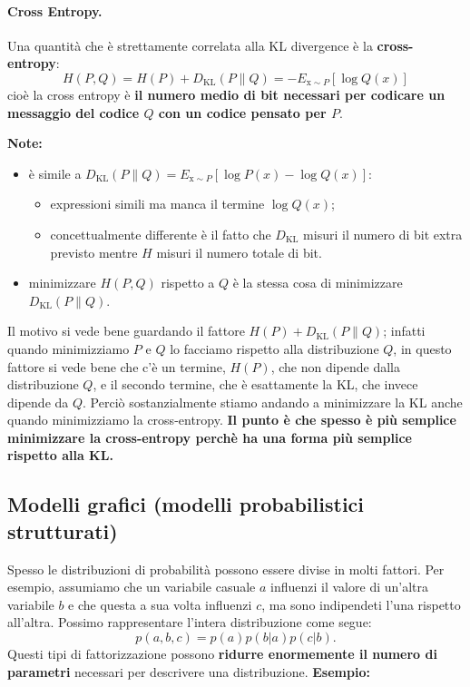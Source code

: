 \paragraph{Cross Entropy.} Una quantità che è strettamente correlata alla KL divergence è la \textbf{cross-entropy}:
\begin{equation}
    H(P,Q)=H(P)+D_{\text{KL}}(P\|Q)=-E_{\text{x}\sim P}[\log Q(x)]
\end{equation}
cioè la cross entropy è \textbf{il numero medio di bit necessari per codicare un messaggio del codice $Q$ con un codice pensato per $P$}.


\textbf{Note:}
\begin{itemize}
    \item è simile a $D_{\text{KL}}(P\|Q)=E_{\text{x}\sim P}[\log P(x)-\log Q(x)]$:
    \begin{itemize}
        \item expressioni simili ma manca il termine $\log Q(x)$;
        \item concettualmente differente è il fatto che $D_{\text{KL}}$ misuri il numero di bit extra previsto mentre $H$ misuri il numero totale di bit.
    \end{itemize}
    \item minimizzare $H(P,Q)$ rispetto a $Q$ è la stessa cosa di minimizzare $D_{\text{KL}}(P\|Q)$. 
\end{itemize}    
    
Il motivo si vede bene guardando il fattore $H(P)+D_{\text{KL}}(P\|Q)$; infatti quando minimizziamo $P$ e $Q$ lo facciamo rispetto alla distribuzione $Q$, in questo fattore si vede bene che c'è un termine, $H(P)$, che non dipende dalla distribuzione $Q$, e il secondo termine, che è esattamente la KL, che invece dipende da $Q$. Perciò sostanzialmente stiamo andando a minimizzare la KL anche quando minimizziamo la cross-entropy. \textbf{Il punto è che spesso è più semplice minimizzare la cross-entropy perchè ha una forma più semplice rispetto alla KL.}

\newpage

\subsection{Modelli grafici (modelli probabilistici strutturati)}
Spesso le distribuzioni di probabilità possono essere divise in molti fattori. Per esempio, assumiamo che un variabile casuale $a$ influenzi il valore di un'altra variabile $b$ e che questa a sua volta influenzi $c$, ma sono indipendeti l'una rispetto all'altra. Possimo rappresentare l'intera distribuzione come segue:
\begin{equation}
    p(a,b,c)=p(a)p(b|a)p(c|b).
\end{equation}
Questi tipi di fattorizzazione possono \textbf{ridurre enormemente il numero di parametri} necessari per descrivere una distribuzione.
\newline
\newline
\textbf{Esempio:}


